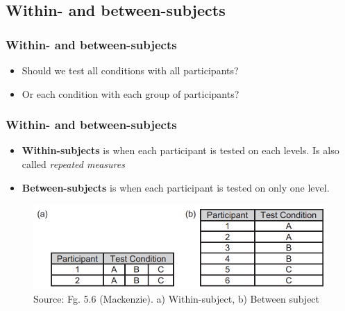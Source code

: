 \documentclass{beamer}
\begin{document}
%


\subsection{Within- and between-subjects}


\begin{frame}
\frametitle{Within- and between-subjects}
\begin{itemize}
	\item Should we test all conditions with all participants?
	\item Or each condition with each group of participants?
\end{itemize}
\end{frame}

\begin{frame}
\frametitle{Within- and between-subjects}
\begin{itemize}
	\item \textbf{Within-subjects} is when each participant is tested on each levels.  Is also called \textit{repeated measures}
	\item \textbf{Between-subjects} is when each participant is tested on only one level.  
\end{itemize}
\begin{figure}
	\includegraphics[width=1\linewidth]{within}
	\caption{Source: Fg. 5.6 (Mackenzie).  a) Within-subject, b) Between subject}
\end{figure}
\end{frame}
\end{document}
